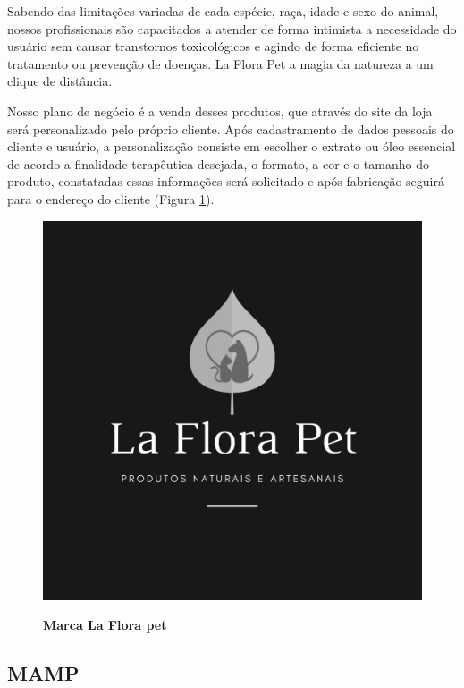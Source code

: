 Sabendo das limitações variadas de cada espécie, raça, idade e sexo do animal, nossos profissionais são capacitados a atender de forma intimista a necessidade do usuário sem causar transtornos toxicológicos e agindo de forma eficiente no tratamento ou prevenção de doenças. La Flora Pet a magia da natureza a um clique de distância.

Nosso plano de negócio é a venda desses produtos, que através do site da loja será personalizado pelo próprio cliente. Após cadastramento de dados pessoais do cliente e usuário, a personalização consiste em escolher o extrato ou óleo essencial de acordo a finalidade terapêutica desejada, o formato, a cor e o tamanho do produto, constatadas essas informações será solicitado e após fabricação seguirá para o endereço do cliente (Figura \ref{figura_24}).


\begin{figure}[H]
\centering
\caption{\textbf{Marca La Flora pet}}
\includegraphics[scale=4.5]{Imagens/laflorapet.png}
\label{figura_24}
\end{figure}



\subsection{MAMP}

